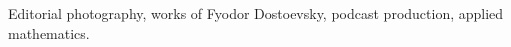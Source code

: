 \documentclass[letterpaper,10pt,oneside]{article}
\newcommand{\CodeCommand}[1]{\mbox{\textbf{\textbackslash{#1}}}}
\begin{document}
\begin{body}
Editorial photography, works of Fyodor Dostoevsky, podcast production, applied mathematics.


\begin{comment}
\section
{References}
{References}
{PDF:References}

Available upon request.
\end{comment}


\begin{comment}

\section
{Section\newline
With\newline
Usage\newline
Examples}
{Section With Usage Examples (For PDF Bookmark)}
{PDF:SectionWithUsageExamples:ForPDFLink}

\subsection
{This is a Subsection}
{This is a Subsection}
{PDF:ThisIsASubSection}

\GapNoBreak
\BulletItem
Use \CodeCommand{section} and \CodeCommand{subsection} to create sections and subsections.
These will appear in the PDF bookmarks too.

\GapNoBreak
\BulletItem
This is the second \CodeCommand{BulletItem}.
Long items are automatically indented.
Lorem ipsum dolor sit amet, consectetur adipiscing elit.
Sed sed aliquam massa.
\begin{detail}
\SubBulletItem
This is a \CodeCommand{SubBulletItem}.
Long items are automatically indented.
Lorem ipsum dolor sit amet, consectetur adipiscing elit.
Sed sed aliquam massa.
Aliquam dignissim mi non enim feugiat elementum.
Donec sit amet turpis ac velit ultrices volutpat.
Aliquam vitae elit massa.
\SubBulletItem
This is the second \CodeCommand{SubBulletItem}.
\SubBulletItem
The \CodeCommand{SubBulletItem}'s are between
\CodeCommand{begin\{detail\}} and
\CodeCommand{end\{detail\}} so that they are typeset in a smaller font.
\end{detail}


\end{comment}
\end{body}
\end{document}
